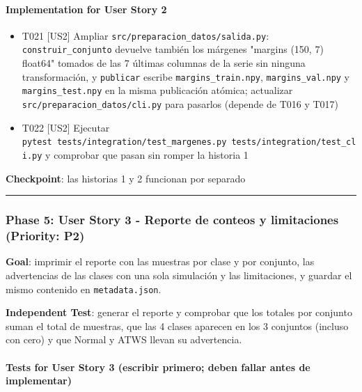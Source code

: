 \documentclass[12pt,a4paper]{article}
\providecommand{\tightlist}{\setlength{\itemsep}{0pt}\setlength{\parskip}{0pt}}
\newenvironment{documentogenerado}[2]{%
  \def\doccomando{#1}\def\docruta{#2}%
  \par\begingroup\small\setstretch{1.15}\sloppy%
}{\endgroup\par\medskip}
\begin{document}
\begin{documentogenerado}{/speckit-tasks (fase 7: /speckit-converge)}{specs\slash 001-preparacion-datos\slash tasks.md}
\paragraph{Implementation for User Story 2}

\begin{itemize}
\tightlist
\item[$\boxtimes$]
  T021 {[}US2{]} Ampliar \texttt{src/\allowbreak{}preparacion\_\allowbreak{}datos/\allowbreak{}salida.\allowbreak{}py}: \texttt{construir\_\allowbreak{}conjunto} devuelve también los márgenes "margins (150, 7) float64" tomados de las 7 últimas columnas de la serie sin ninguna transformación, y \texttt{publicar} escribe \texttt{margins\_\allowbreak{}train.\allowbreak{}npy}, \texttt{margins\_\allowbreak{}val.\allowbreak{}npy} y \texttt{margins\_\allowbreak{}test.\allowbreak{}npy} en la misma publicación atómica; actualizar \texttt{src/\allowbreak{}preparacion\_\allowbreak{}datos/\allowbreak{}cli.\allowbreak{}py} para pasarlos (depende de T016 y T017)
\item[$\boxtimes$]
  T022 {[}US2{]} Ejecutar \texttt{pytest\ tests/\allowbreak{}integration/\allowbreak{}test\_\allowbreak{}margenes.\allowbreak{}py\ tests/\allowbreak{}integration/\allowbreak{}test\_\allowbreak{}cli.\allowbreak{}py} y comprobar que pasan sin romper la historia 1
\end{itemize}

\textbf{Checkpoint}: las historias 1 y 2 funcionan por separado

\begin{center}\rule{0.5\linewidth}{0.5pt}\end{center}

\subsubsection{Phase 5: User Story 3 - Reporte de conteos y limitaciones (Priority: P2)}

\textbf{Goal}: imprimir el reporte con las muestras por clase y por conjunto, las advertencias de las clases con una sola simulación y las limitaciones, y guardar el mismo contenido en \texttt{metadata.\allowbreak{}json}.

\textbf{Independent Test}: generar el reporte y comprobar que los totales por conjunto suman el total de muestras, que las 4 clases aparecen en los 3 conjuntos (incluso con cero) y que Normal y ATWS llevan su advertencia.

\paragraph{Tests for User Story 3 (escribir primero; deben fallar antes de implementar)}


\end{documentogenerado}
\end{document}
